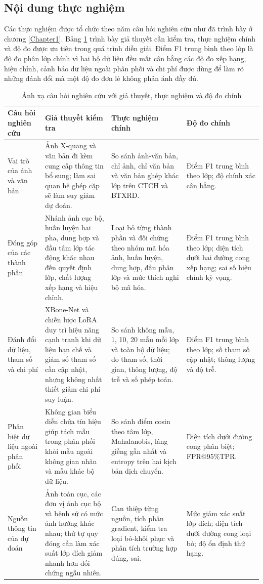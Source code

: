 \subsection{Nội dung thực nghiệm}
\label{sec:experiment_content}
Các thực nghiệm được tổ chức theo năm câu hỏi nghiên cứu như đã trình bày ở chương \ref{Chapter1}. Bảng \ref{tab:research_question_mapping} trình bày giả thuyết cần kiểm tra, thực nghiệm chính và độ đo được ưu tiên trong quá trình diễn giải. Điểm F1 trung bình theo lớp là độ đo phân lớp chính vì hai bộ dữ liệu đều mất cân bằng các độ đo xếp hạng, hiệu chỉnh, cảnh báo dữ liệu ngoài phân phối và chi phí được dùng để làm rõ những đánh đổi mà một độ đo đơn lẻ không phản ánh đầy đủ.

\begin{table}[H]
\centering
\scriptsize
\renewcommand{\arraystretch}{1.2}
\begin{tabularx}{\textwidth}{|p{2.25cm}|X|X|p{3.0cm}|}
\hline
\textbf{Câu hỏi nghiên cứu} & \textbf{Giả thuyết kiểm tra} & \textbf{Thực nghiệm chính} & \textbf{Độ đo chính} \\ \hline
Vai trò của ảnh và văn bản & Ảnh X-quang và văn bản đi kèm cung cấp thông tin bổ sung; làm sai quan hệ ghép cặp sẽ làm suy giảm dự đoán. & So sánh ảnh-văn bản, chỉ ảnh, chỉ văn bản và văn bản ghép khác lớp trên CTCH và BTXRD. & Điểm F1 trung bình theo lớp; độ chính xác cân bằng. \\ \hline
Đóng góp của các thành phần & Nhánh ảnh cục bộ, huấn luyện hai pha, dung hợp và đầu tâm lớp tác động khác nhau đến quyết định lớp, chất lượng xếp hạng và hiệu chỉnh. & Loại bỏ từng thành phần và đối chứng theo nhóm mã hóa ảnh, huấn luyện, dung hợp, đầu phân lớp và mức thích nghi bộ mã hóa. & Điểm F1 trung bình theo lớp; diện tích dưới hai đường cong xếp hạng; sai số hiệu chỉnh kỳ vọng. \\ \hline
Đánh đổi dữ liệu, tham số và chi phí & XBone-Net và chiến lược LoRA duy trì hiệu năng cạnh tranh khi dữ liệu hạn chế và giảm số tham số cần cập nhật, nhưng không nhất thiết giảm chi phí suy luận. & So sánh không mẫu, 1, 10, 20 mẫu mỗi lớp và toàn bộ dữ liệu; đo tham số, thời gian, thông lượng, độ trễ và số phép toán. & Điểm F1 trung bình theo lớp; số tham số cập nhật; thông lượng và độ trễ. \\ \hline
Phân biệt dữ liệu ngoài phân phối & Không gian biểu diễn chứa tín hiệu giúp tách mẫu trong phân phối khỏi mẫu ngoài không gian nhãn và mẫu khác bộ dữ liệu. & So sánh điểm cosin theo tâm lớp, Mahalanobis, láng giềng gần nhất và entropy trên hai kịch bản dịch chuyển. & Diện tích dưới đường cong phân biệt; FPR@95\%TPR. \\ \hline
Nguồn thông tin của dự đoán & Ảnh toàn cục, các đơn vị ảnh cục bộ và bệnh sử có mức ảnh hưởng khác nhau; thứ tự quy đóng cần làm xác suất lớp đích giảm nhanh hơn đối chứng ngẫu nhiên. & Can thiệp từng nguồn, tích phân gradient, kiểm tra loại bỏ-khôi phục và phân tích trường hợp đúng, sai. & Mức giảm xác suất lớp đích; diện tích dưới đường cong loại bỏ; độ ổn định thứ hạng. \\ \hline
\end{tabularx}
\caption{Ánh xạ câu hỏi nghiên cứu với giả thuyết, thực nghiệm và độ đo chính}
\label{tab:research_question_mapping}
\end{table}

